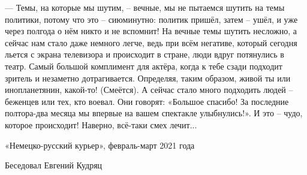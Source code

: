 — Темы, на которые мы шутим, – вечные, мы не пытаемся шутить на темы политики,
потому что это – сиюминутно: политик пришёл, затем – ушёл, и уже через полгода
о нём никто и не вспомнит! На вечные темы шутить несложно, а сейчас нам стало
даже немного легче, ведь при всём негативе, который сегодня льется с экрана
телевизора и происходит в стране, люди вдруг потянулись в театр. Самый большой
комплимент для актёра, когда к тебе сзади подходит зритель и незаметно
дотрагивается. Определяя, таким образом, живой ты или инопланетянин, какой-то!
(Смеётся). А сейчас стало много подходить людей – беженцев или тех, кто воевал.
Они говорят: «Большое спасибо! За последние полтора-два месяца мы впервые на
вашем спектакле улыбнулись!». И это – чудо, которое происходит! Наверно,
всё-таки смех лечит...


«Немецко-русский курьер», февраль-март 2021 года

Беседовал Евгений Кудряц
